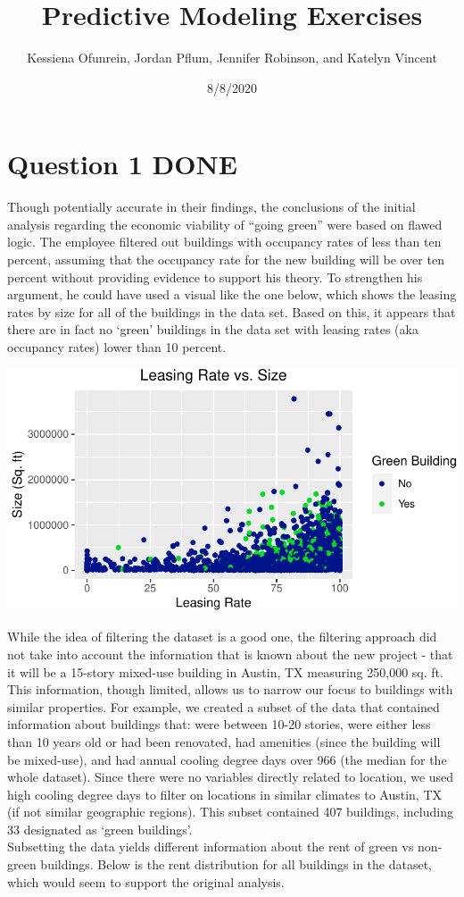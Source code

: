 \documentclass[
]{article}
\title{Predictive Modeling Exercises}
\author{Kessiena Ofunrein, Jordan Pflum, Jennifer Robinson, and Katelyn Vincent}
\date{8/8/2020}
\begin{document}
\maketitle

\hypertarget{question-1-done}{%
\section{Question 1 DONE}\label{question-1-done}}

Though potentially accurate in their findings, the conclusions of the
initial analysis regarding the economic viability of ``going green''
were based on flawed logic. The employee filtered out buildings with
occupancy rates of less than ten percent, assuming that the occupancy
rate for the new building will be over ten percent without providing
evidence to support his theory. To strengthen his argument, he could
have used a visual like the one below, which shows the leasing rates by
size for all of the buildings in the data set. Based on this, it appears
that there are in fact no `green' buildings in the data set with leasing
rates (aka occupancy rates) lower than 10 percent.

\begin{center}\includegraphics{STA380Exercises_Ofunrein_Pflum_Robinson_Vincent_files/figure-latex/unnamed-chunk-2-1} \end{center}

While the idea of filtering the dataset is a good one, the filtering
approach did not take into account the information that is known about
the new project - that it will be a 15-story mixed-use building in
Austin, TX measuring 250,000 sq. ft. This information, though limited,
allows us to narrow our focus to buildings with similar properties. For
example, we created a subset of the data that contained information
about buildings that: were between 10-20 stories, were either less than
10 years old or had been renovated, had amenities (since the building
will be mixed-use), and had annual cooling degree days over 966 (the
median for the whole dataset). Since there were no variables directly
related to location, we used high cooling degree days to filter on
locations in similar climates to Austin, TX (if not similar geographic
regions). This subset contained 407 buildings, including 33 designated
as `green buildings'.\\
Subsetting the data yields different information about the rent of green
vs non-green buildings. Below is the rent distribution for all buildings
in the dataset, which would seem to support the original analysis.
\end{document}
